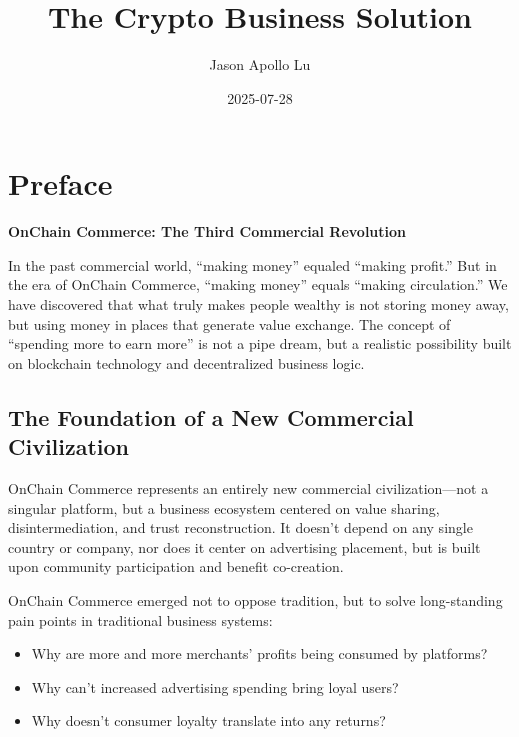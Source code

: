 \documentclass[
  Letterpaper,
]{scrbook}
\title{The Crypto Business Solution}
\author{Jason Apollo Lu}
\date{2025-07-28}
\providecommand{\tightlist}{%
  \setlength{\itemsep}{0pt}\setlength{\parskip}{0pt}}
\renewcommand*\contentsname{Table of contents}
\newcommand\contentsname{Table of contents}
\begin{document}
\frontmatter
\maketitle

\renewcommand*\contentsname{Table of contents}
{
\setcounter{tocdepth}{1}
\tableofcontents
}

\mainmatter
{}

\chapter*{Preface}\label{preface}


\textbf{OnChain Commerce: The Third Commercial Revolution}

In the past commercial world, ``making money'' equaled ``making
profit.'' But in the era of OnChain Commerce, ``making money'' equals
``making circulation.'' We have discovered that what truly makes people
wealthy is not storing money away, but using money in places that
generate value exchange. The concept of ``spending more to earn more''
is not a pipe dream, but a realistic possibility built on blockchain
technology and decentralized business logic.

\section*{The Foundation of a New Commercial
Civilization}\label{the-foundation-of-a-new-commercial-civilization}


OnChain Commerce represents an entirely new commercial
civilization---not a singular platform, but a business ecosystem
centered on value sharing, disintermediation, and trust reconstruction.
It doesn't depend on any single country or company, nor does it center
on advertising placement, but is built upon community participation and
benefit co-creation.

OnChain Commerce emerged not to oppose tradition, but to solve
long-standing pain points in traditional business systems:

\begin{itemize}
\tightlist
\item
  Why are more and more merchants' profits being consumed by platforms?
\item
  Why can't increased advertising spending bring loyal users?
\item
  Why doesn't consumer loyalty translate into any returns?
\end{itemize}
\end{document}
